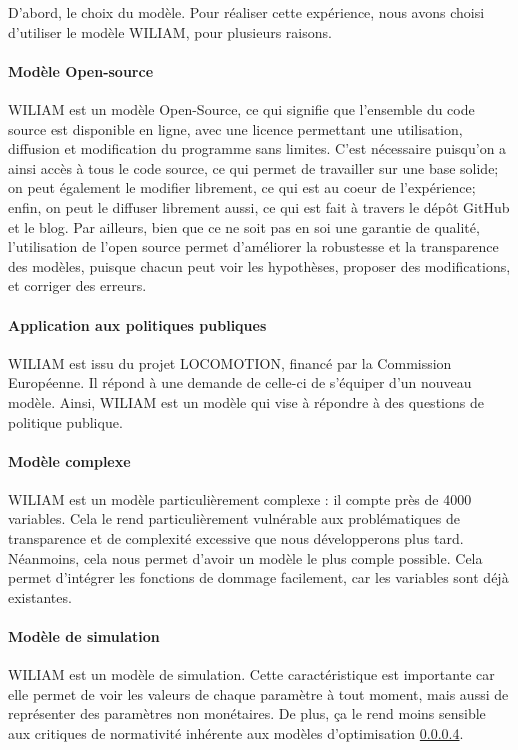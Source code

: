 D'abord, le choix du modèle. Pour réaliser cette expérience, nous avons choisi d'utiliser le modèle WILIAM, pour plusieurs raisons. 

\paragraph{Modèle Open-source}WILIAM est un modèle Open-Source, ce qui signifie que l'ensemble du code source est disponible en ligne, avec une licence permettant une utilisation, diffusion et modification du programme sans limites. C'est nécessaire puisqu'on a ainsi accès à tous le code source, ce qui permet de travailler sur une base solide; on peut également le modifier librement, ce qui est au coeur de l'expérience; enfin, on peut le diffuser librement aussi, ce qui est fait à travers le dépôt GitHub et le blog. Par ailleurs, bien que ce ne soit pas en soi une garantie de qualité, l'utilisation de l'open source permet d'améliorer la robustesse et la transparence des modèles, puisque chacun peut voir les hypothèses, proposer des modifications, et corriger des erreurs. 

\paragraph{Application aux politiques publiques} WILIAM est issu du projet LOCOMOTION, financé par la Commission Européenne. Il répond à une demande de celle-ci de s'équiper d'un nouveau modèle. Ainsi, WILIAM est un modèle qui vise à répondre à des questions de politique publique. 

\paragraph{Modèle complexe} WILIAM est un modèle particulièrement complexe : il compte près de 4000 variables. Cela le rend particulièrement vulnérable aux problématiques de transparence et de complexité excessive que nous développerons plus tard. Néanmoins, cela nous permet d'avoir un modèle le plus comple possible. Cela permet d'intégrer les fonctions de dommage facilement, car les variables sont déjà existantes. 

\paragraph{Modèle de simulation} WILIAM est un modèle de simulation. Cette caractéristique est importante car elle permet de voir les valeurs de chaque paramètre à tout moment, mais aussi de représenter des paramètres non monétaires. De plus, ça le rend moins sensible aux critiques de normativité inhérente aux modèles d'optimisation \ref{}. 

